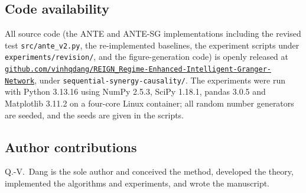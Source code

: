 \documentclass[pdflatex,sn-mathphys-ay]{sn-jnl}%
\theoremstyle{thmstyleone}%
\theoremstyle{thmstyletwo}%
\theoremstyle{thmstylethree}%
\begin{document}
\subsection*{Code availability}
All source code (the ANTE and ANTE-SG implementations including the revised test
\texttt{src/ante\_v2.py}, the re-implemented baselines, the experiment scripts under
\texttt{experiments/revision/}, and the figure-generation code) is openly released at
\href{https://github.com/vinhqdang/REIGN_Regime-Enhanced-Intelligent-Granger-Network}{\texttt{github.com/vinhqdang/REIGN\_Regime-Enhanced-Intelligent-Granger-Network}}, under
\texttt{sequential-synergy-causality/}. The experiments were run with Python 3.13.16 using
NumPy 2.5.3, SciPy 1.18.1, pandas 3.0.5 and Matplotlib 3.11.2 on a four-core Linux container; all random number
generators are seeded, and the seeds are given in the scripts.

\subsection*{Author contributions}
Q.-V.~Dang is the sole author and conceived the method, developed the theory, implemented the
algorithms and experiments, and wrote the manuscript.
\end{document}
